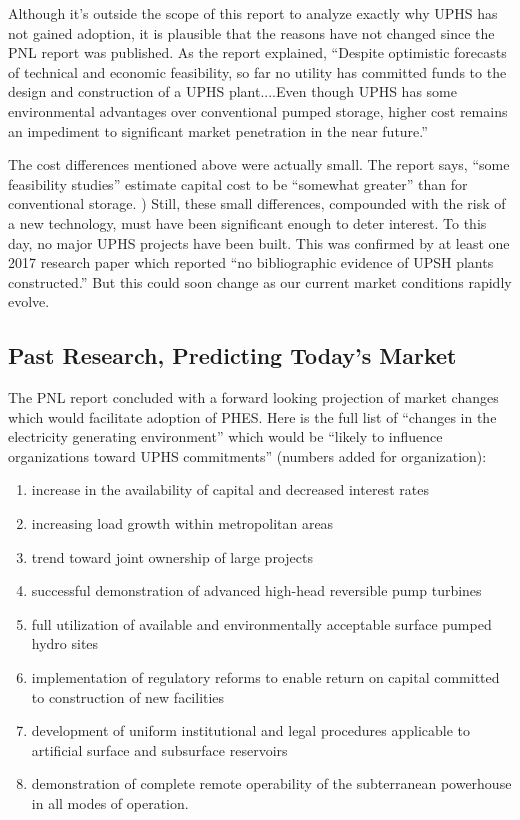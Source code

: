 \documentclass[hidelinks,12pt,a4paper]{article}
\begin{document}
Although it's outside the scope of this report to analyze exactly why UPHS has not gained adoption, it is plausible that the reasons have not changed since the PNL report was published. As the report explained, “Despite optimistic forecasts of technical and economic feasibility, so far no utility has committed funds to the design and construction of a UPHS plant....Even though UPHS has some environmental advantages over conventional pumped storage, higher cost remains an impediment to significant market penetration in the near future.” \cite{SubSurfacePumpedHydroelectricStorage}

The cost differences mentioned above were actually small. The report says, “some feasibility studies” estimate capital cost to be “somewhat greater” than for conventional storage. \cite{SubSurfacePumpedHydroelectricStorage}) Still, these small differences, compounded with the risk of a new technology, must have been significant enough to deter interest. To this day, no major UPHS projects have been built. This was confirmed by at least one 2017 research paper which reported “no bibliographic evidence of UPSH plants constructed.” \cite{UndergroundPumpedStorageHydropowerPlantsUsingOpenPitMines}
But this could soon change as our current market conditions rapidly evolve.

\subsection{Past Research, Predicting Today's Market}
The PNL report concluded with a forward looking projection of market changes which would facilitate adoption of PHES. Here is the full list of “changes in the electricity generating environment” which would be “likely to influence organizations toward UPHS commitments” \cite{SubSurfacePumpedHydroelectricStorage} (numbers added for organization):

{\footnotesize
\begin{enumerate}
    \item increase in the availability of capital and decreased interest rates
    \item increasing load growth within metropolitan areas
    \item trend toward joint ownership of large projects
    \item successful demonstration of advanced high-head reversible pump turbines
    \item full utilization of available and environmentally acceptable surface pumped hydro sites
    \item implementation of regulatory reforms to enable return on capital committed to construction of new facilities
    \item development of uniform institutional and legal procedures applicable to artificial surface and subsurface reservoirs
    \item demonstration of complete remote operability of the subterranean powerhouse in all modes of operation.
\end{enumerate}
}
\end{document}
